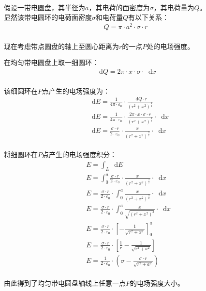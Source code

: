 \documentclass[UTF8]{ctexart}
\newcommand*{\dif}{\mathop{}\!\mathrm{d}}
\begin{document}
    假设一带电圆盘，其半径为$a$，其电荷的面密度为$\sigma$，其电荷量为$Q$。\\[3mm]
    显然该带电圆环的电荷面密度$\sigma$和电荷量$Q$有以下关系：\vspace{3pt}
    \begin{align}
        Q=\pi\cdot a^2\cdot\sigma\cdot r
    \end{align}\\
    现在考虑带点圆盘的轴上至圆心距离为$r$的一点$P$处的电场强度。

\newpage

    在均匀带电圆盘上取一细圆环：
    \begin{align}
        \dif Q=2\pi\cdot x\cdot\sigma\cdot\dif x
    \end{align}\\
    该细圆环在$P$点产生的电场强度为：\vspace{3pt}
    \begin{align}
        &\dif E=\frac{1}{4\pi\cdot\varepsilon_0}\cdot\frac{\dif Q\cdot r}{\left(r^2+x^2\right)^{\frac{3}{2}}}\\[6.5mm]
        &\dif E=\frac{1}{4\pi\cdot\varepsilon_0}\cdot\frac{2\pi\cdot x\cdot\sigma\cdot r}{\left(r^2+x^2\right)^\frac{3}{2}}\cdot\dif x\\[6.5mm]
        &\dif E=\frac{\sigma\cdot r}{2\cdot\varepsilon_0}\cdot\frac{x}{\left(r^2+x^2\right)^\frac{3}{2}}\cdot\dif x
    \end{align}\\
    将细圆环在$P$点产生的电场强度积分：\vspace{5pt}
    \begin{align}
        &E=\int_L\dif E\\[6mm]
        &E=\int_0^a\frac{\sigma\cdot r}{2\cdot\varepsilon_0}\cdot\frac{x}{\left(r^2+x^2\right)^{\frac{3}{2}}}\cdot\dif x\\[6.5mm]
        &E=\frac{\sigma\cdot r}{2\cdot\varepsilon_0}\cdot\int_0^a\frac{x}{\left(r^2+x^2\right)^{\frac{3}{2}}}\cdot\dif x\\[6.5mm]
        &E=\frac{\sigma\cdot r}{2\cdot\varepsilon_0}\cdot\int_0^a\frac{x}{\sqrt{(r^2+x^2)^3}}\cdot\dif x\\[6.5mm]
        &E=\frac{\sigma\cdot r}{2\cdot\varepsilon_0}\cdot\left[-\frac{1}{\sqrt{r^2+x^2}}\right]_0^a\\[6.5mm]
        &E=\frac{\sigma\cdot r}{2\cdot\varepsilon_0}\cdot\left[\frac{1}{r}-\frac{1}{\sqrt{r^2+a^2}}\right]\\[6.5mm]
        &E=\frac{1}{2\cdot\varepsilon_0}\cdot\left(\sigma-\frac{\sigma\cdot r}{\sqrt{r^2+a^2}}\right)
    \end{align}\\
    由此得到了均匀带电圆盘轴线上任意一点$P$的电场强度大小。
\end{document}
